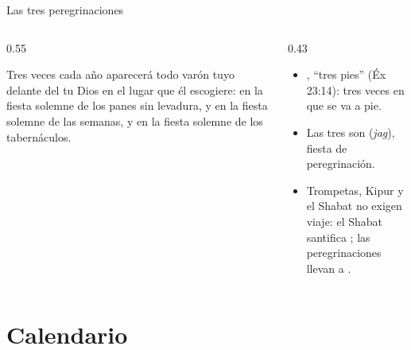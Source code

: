 \begin{frame}{Las tres peregrinaciones}
\begin{columns}[c,onlytextwidth]
\begin{column}{0.55\textwidth}
\centering\scriptsize{}
\begin{cita}Tres veces cada año aparecerá todo varón tuyo delante del \SENOR{} tu Dios en el lugar que él escogiere: en la fiesta solemne de los panes sin levadura, y en la fiesta solemne de las semanas, y en la fiesta solemne de los tabernáculos.\end{cita}
\end{column}
\begin{column}{0.43\textwidth}\small
\begin{itemize}
\item {}, ``tres pies'' (Éx 23:14): tres veces en que se va a pie.
\item Las tres son  (\emph{jag}), fiesta de peregrinación.
\item Trompetas, Kipur y el Shabat no exigen viaje: el Shabat santifica ; las peregrinaciones llevan a .
\end{itemize}
\end{column}
\end{columns}
\end{frame}

\section{Calendario}

